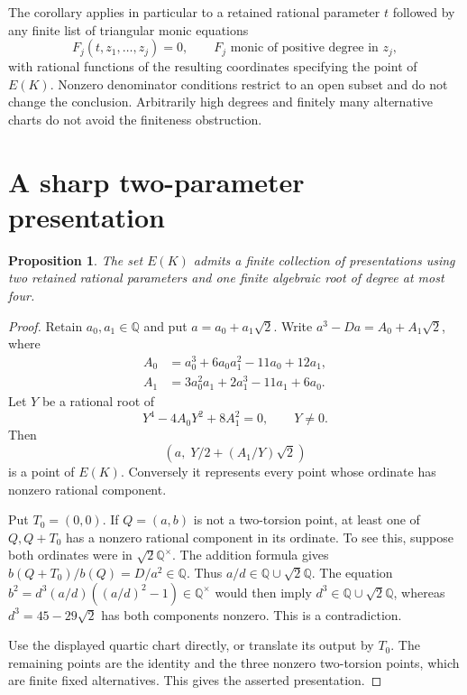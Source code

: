 \documentclass[11pt,a4paper]{article}
\newtheorem{proposition}[theorem]{Proposition}
\theoremstyle{definition}\newtheorem{definition}[theorem]{Definition}
\begin{document}
The corollary applies in particular to a retained rational parameter
$t$ followed by any finite list of triangular monic equations
\[
 F_j(t,z_1,\ldots,z_j)=0,
 \qquad F_j\text{ monic of positive degree in }z_j,
\]
with rational functions of the resulting coordinates specifying
the point of $E(K)$. Nonzero denominator conditions restrict to
an open subset and do not change the conclusion. Arbitrarily high
degrees and finitely many alternative charts do not avoid the
finiteness obstruction.

\section{A sharp two-parameter presentation}

\begin{proposition}\label{prop:two-parameters}
The set $E(K)$ admits a finite collection of presentations using
two retained rational parameters and one finite algebraic root
of degree at most four.
\end{proposition}
\begin{proof}
Retain $a_0,a_1\in\mathbb Q$ and put $a=a_0+a_1\sqrt2$.
Write $a^3-Da=A_0+A_1\sqrt2$, where
\[
 \begin{aligned}
 A_0&=a_0^3+6a_0a_1^2-11a_0+12a_1,\\
 A_1&=3a_0^2a_1+2a_1^3-11a_1+6a_0.
 \end{aligned}
\]
Let $Y$ be a rational root of
\[
                 Y^4-4A_0Y^2+8A_1^2=0,
                 \qquad Y\ne0.
\]
Then
\[
                    (a,\;Y/2+(A_1/Y)\sqrt2)
\]
is a point of $E(K)$. Conversely it represents every point whose
ordinate has nonzero rational component.

Put $T_0=(0,0)$. If $Q=(a,b)$ is not a two-torsion point,
at least one of $Q,Q+T_0$ has a nonzero rational component in
its ordinate. To see this, suppose both ordinates were in
$\sqrt2\mathbb Q^\times$. The addition formula gives
$b(Q+T_0)/b(Q)=D/a^2\in\mathbb Q$. Thus
$a/d\in\mathbb Q\cup\sqrt2\mathbb Q$.
The equation $b^2=d^3(a/d)((a/d)^2-1)\in\mathbb Q^\times$
would then imply $d^3\in\mathbb Q\cup\sqrt2\mathbb Q$,
whereas $d^3=45-29\sqrt2$ has both components nonzero.
This is a contradiction.

Use the displayed quartic chart directly, or translate its output
by $T_0$. The remaining points are the identity and the three
nonzero two-torsion points, which are finite fixed alternatives.
This gives the asserted presentation.
\end{proof}
\end{document}
